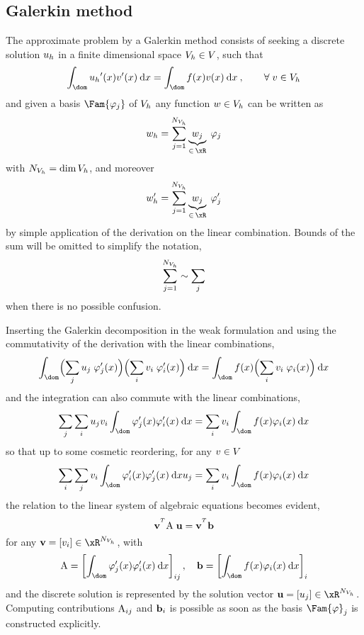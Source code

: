 \subsection{Galerkin method}

The approximate problem by a Galerkin method consists of seeking a discrete solution ${u_h}$ in a finite dimensional space ${{V}}_h \in {V}$, such that
\begin{equation*}
\int_\dom \uh'(x) v'(x) \md x = \int_\dom f(x) v(x) \md x\:,\qquad\forany v \in \xVh
\end{equation*}
and given a basis $\Fam{\varphi_j}$ of ${{V}}_h$ any function $w\in{{V}}_h$ can be written as
\begin{equation*}
w_h = \sum_{j=1}^{\NxVh} \underbrace{w_j}_{\in\,\xR}\;\varphi_j
\end{equation*}
with ${N_{{{V}}_h}} = \dim{{{V}}_h}$, and moreover
\begin{equation*}
w'_h = \sum_{j=1}^{\NxVh} \underbrace{w_j}_{\in\,\xR}\;\varphi'_j
\end{equation*}
by simple application of the derivation on the linear combination.
Bounds of the sum will be omitted to simplify the notation,
\begin{equation*}
\sum_{j=1}^{{N_{{{V}}_h}}} \sim \sum_{j}
\end{equation*}
 when there is no possible confusion.

\medskip
Inserting the Galerkin decomposition in the weak formulation and using the commutativity of the derivation with the linear combinations,
\begin{equation*}
\int_\dom \Bigl(\sum_{j} u_j\;\varphi'_j(x)\Bigr) \Bigl(\sum_{i} v_i\;\varphi'_i(x)\Bigr) \md x = \int_\dom f(x) \Bigl(\sum_{i} v_i\;\varphi_i(x)\Bigr) \md x
\end{equation*}
and the integration can also commute with the linear combinations,
\begin{equation*}
\sum_{j} \sum_{i} u_j v_i \int_\dom \varphi'_j(x)\varphi'_i(x) \md x = \sum_{i} v_i\int_\dom f(x) \varphi_i(x) \md x
\end{equation*}
so that up to some cosmetic reordering, for any $v \in {V}$
\begin{equation*}
\sum_{i}  \sum_{j} v_i \int_\dom \varphi'_i(x)\varphi'_j(x) \md x u_j = \sum_{i} v_i\int_\dom f(x) \varphi_i(x) \md x
\end{equation*}
the relation to the linear system of algebraic equations becomes evident,
\begin{equation*}
\vecv^\trans \matA\;\vecu = \vecv^\trans \vecb
\end{equation*}
for any $\vecv = [v_i]\in \xR^\NxVh$, with
\begin{equation*}
\matA = \left[\int_\dom \varphi'_j(x)\varphi'_i(x) \md x\right]_{ij},\quad\vecb = \left[\int_\dom f(x) \varphi_i(x) \md x\right]_{i}
\end{equation*}
and the discrete solution is represented by the solution vector $\vecu = [u_j]\in \xR^\NxVh$.
Computing contributions ${\mathrm A}_{ij}$ and $\mathbf b_i$ is possible as soon as the basis $\Fam{\varphi}_j$ is constructed explicitly.


